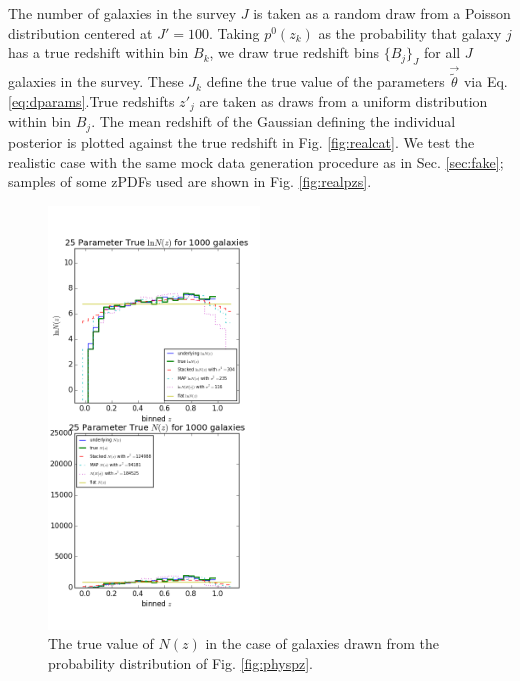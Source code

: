 \documentclass[preprint]{aastex}
\begin{document}
The number of galaxies in the survey $J$ is taken as a random draw from a Poisson distribution centered at $J'=100$.  Taking $p^{0}(z_{k})$ as the probability that galaxy $j$ has a true redshift within bin $B_{k}$, we draw true redshift bins $\{B_{j}\}_{J}$ for all $J$ galaxies in the survey.  These $J_{k}$ define the true value of the parameters $\vec{\tilde{\theta}}$ via Eq. \ref{eq:dparams}.True redshifts $z'_{j}$ are taken as draws from a uniform distribution within bin $B_{j}$.  The mean redshift of the Gaussian defining the individual posterior is plotted against the true redshift in Fig. \ref{fig:realcat}.  We test the realistic case with the same mock data generation procedure as in Sec. \ref{sec:fake}; samples of some zPDFs used are shown in Fig. \ref{fig:realpzs}.

\begin{figure}
\includegraphics[width=0.5\textwidth]{trueNz-real.png}
\caption{The true value of $N(z)$ in the case of galaxies drawn from the probability distribution of Fig. \ref{fig:physpz}.}
\label{fig:realtrueNz}
\end{figure}
\end{document}
